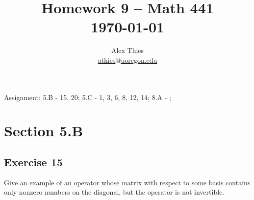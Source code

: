 \documentclass[letterpaper, 12pt]{amsart}
\theoremstyle{definition}  							%
\begin{document}
	\title{Homework 9  -- Math 441 \\ \today}
	\author{Alex Thies \\ \href{mailto:athies@uoregon.edu}{\lowercase{athies$@$uoregon.edu}}}

	\maketitle

	Assignment: 5.B - 15, 20; 5.C - 1, 3, 6, 8, 12, 14; 8.A - ;

	\section*{Section 5.B}
		\subsection*{Exercise 15}
		Give an example of an operator whose matrix with respect to some basis contains only nonzero numbers on the diagonal, but the operator is not invertible.
		\vspace*{3mm}
\end{document}
